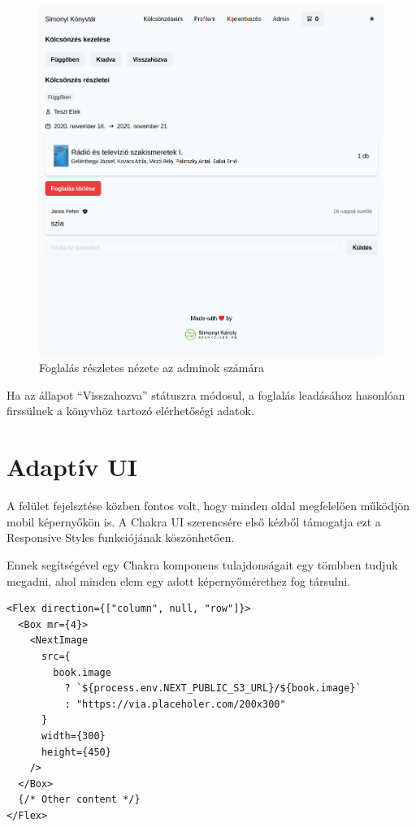 \begin{figure}[!ht]
  \centering
  \includegraphics[width=150mm, keepaspectratio]{figures/order-admin-detail.png}
  \caption{Foglalás részletes nézete az adminok számára}
  \label{fig:OrderAdminDetail}
\end{figure}

Ha az állapot ``Visszahozva'' státuszra módosul, a foglalás leadásához hasonlóan firssülnek a könyvhöz tartozó elérhetőségi adatok.

\section{Adaptív UI}

A felület fejelsztése közben fontos volt, hogy minden oldal megfelelően működjön mobil képernyőkön is.
A Chakra UI szerencsére első kézből támogatja ezt a Responsive Styles funkciójának köszönhetően.

Ennek segítségével egy Chakra komponens tulajdonságait egy tömbben tudjuk megadni, ahol minden elem egy adott képernyőmérethez
fog társulni.

\begin{lstlisting}[caption=Chakra UI Responsive Styles használata]
<Flex direction={["column", null, "row"]}>
  <Box mr={4}>
    <NextImage
      src={
        book.image
          ? `${process.env.NEXT_PUBLIC_S3_URL}/${book.image}`
          : "https://via.placeholer.com/200x300"
      }
      width={300}
      height={450}
    />
  </Box>
  {/* Other content */}
</Flex>
\end{lstlisting}

